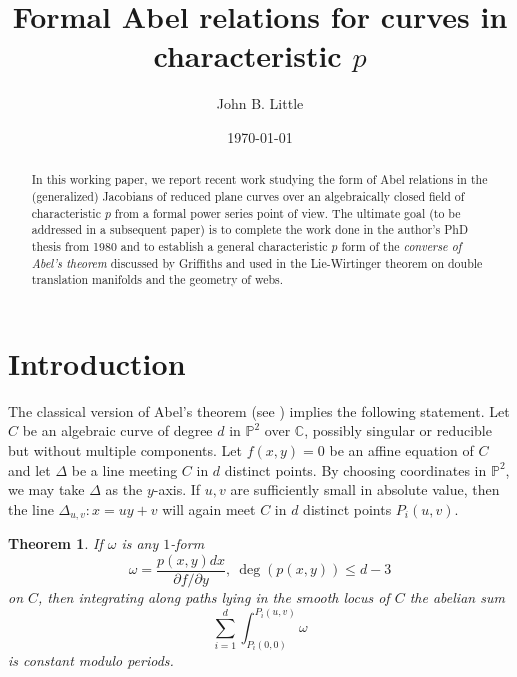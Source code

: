 \documentclass[12pt]{amsart}
\theoremstyle{theorem}
\newtheorem{thm}{Theorem}
\newcommand{\PP}{\mathbb{P}}
\newcommand{\CC}{\mathbb{C} }
\begin{document}
\title{Formal Abel relations for curves in characteristic $p$}
\author{John B. Little}
\address{Professor {\it emeritus} of Mathematics\\
College of the Holy Cross, Worcester, MA 01610}

\date{\today}


\begin{abstract}
In this working paper, we report recent work studying the form of Abel relations in the (generalized) Jacobians of reduced plane curves over an algebraically closed
field of characteristic $p$ from a formal power series point of view.  The ultimate goal (to be addressed in a subsequent paper) is to complete the work done in the author's PhD thesis from 
1980 and to establish a general characteristic $p$ form of the \emph{converse of 
Abel's theorem} discussed by Griffiths and used in the Lie-Wirtinger theorem on double translation manifolds and the  geometry of webs.  
\end{abstract}

\maketitle

\section{Introduction}

The classical version of Abel's theorem (see \cite{LitAbel,Grif}) implies
the following statement.  Let $C$ be an algebraic curve of degree $d$ in $\PP^2$ over $\CC$, possibly singular or reducible  but without multiple components.   
Let $f(x,y) = 0$ be an affine equation of $C$ and let $\Delta$ be a line meeting $C$ in $d$ distinct points.  By choosing coordinates in $\PP^2$, we may take $\Delta$
as the $y$-axis.  If $u,v$ are sufficiently small in absolute value, then the line $\Delta_{u,v}:  x = uy + v$ will again meet $C$ in $d$ distinct points
$P_i(u,v)$. 

\begin{thm}
\label{AbClassical}
 If $\omega$ is any $1$-form 
\begin{equation}
\label{AbDiff} 
\omega = \frac{p(x,y) dx}{\partial f/ \partial y},\ \deg(p(x,y)) \le d - 3
\end{equation}
on $C$, then integrating along paths lying in the smooth locus of $C$ the abelian sum 
\begin{equation}
\label{AbSum}
\sum_{i=1}^d \int_{P_i(0,0)}^{P_i(u,v)} \omega
\end{equation}
is constant modulo periods.  
\end{thm}
\end{document}

